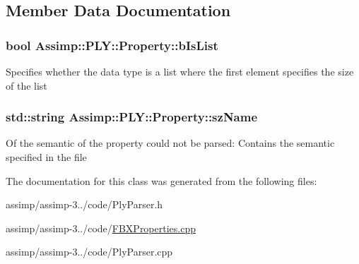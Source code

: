 \subsection{Member Data Documentation}
\hypertarget{class_assimp_1_1_p_l_y_1_1_property_aa732dc64999ba71453d792e1de0dfd44}{
\subsubsection[{b\+Is\+List}]{\setlength{\rightskip}{0pt plus 5cm}bool Assimp\+::\+P\+L\+Y\+::\+Property\+::b\+Is\+List}}\label{class_assimp_1_1_p_l_y_1_1_property_aa732dc64999ba71453d792e1de0dfd44}
Specifies whether the data type is a list where the first element specifies the size of the list \hypertarget{class_assimp_1_1_p_l_y_1_1_property_a4c10eda3b3b890e0fdb5035a0a40a714}{
\subsubsection[{sz\+Name}]{\setlength{\rightskip}{0pt plus 5cm}std\+::string Assimp\+::\+P\+L\+Y\+::\+Property\+::sz\+Name}}\label{class_assimp_1_1_p_l_y_1_1_property_a4c10eda3b3b890e0fdb5035a0a40a714}
Of the semantic of the property could not be parsed\+: Contains the semantic specified in the file 

The documentation for this class was generated from the following files\+:\begin{DoxyCompactItemize}
\item 
assimp/assimp-\/3../code/Ply\+Parser.\+h\item 
assimp/assimp-\/3../code/\hyperlink{_f_b_x_properties_8cpp}{F\+B\+X\+Properties.\+cpp}\item 
assimp/assimp-\/3../code/Ply\+Parser.\+cpp\end{DoxyCompactItemize}
